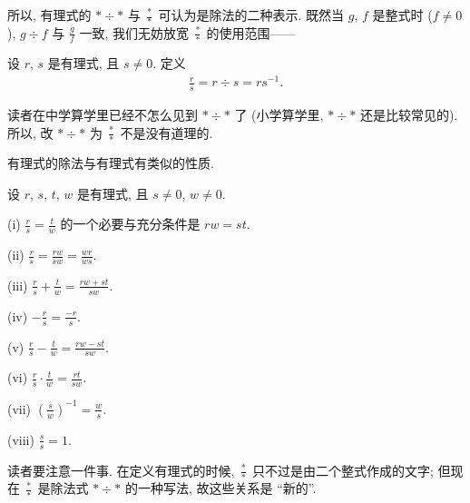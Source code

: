 所以, 有理式的 $\ast \div \ast$ 与 $\frac{\ast}{\ast}$ 可认为是除法的二种表示. 既然当 $g$, $f$ 是整式时 ($f \neq 0$), $g \div f$ 与 $\frac{g}{f}$ 一致, 我们无妨放宽 $\frac{\ast}{\ast}$ 的使用范围——
\begin{definition}
    设 $r$, $s$ 是有理式, 且 $s \neq 0$. 定义
    \begin{align*}
        \frac{r}{s} = r \div s = rs^{-1}.
    \end{align*}
\end{definition}

读者在中学算学里已经不怎么见到 $\ast \div \ast$ 了 (小学算学里, $\ast \div \ast$ 还是比较常见的). 所以, 改 $\ast \div \ast$ 为 $\frac{\ast}{\ast}$ 不是没有道理的.

有理式的除法与有理式有类似的性质.

\begin{proposition}
    设 $r$, $s$, $t$, $w$ 是有理式, 且 $s \neq 0$, $w \neq 0$.

    (i) $\frac{r}{s} = \frac{t}{w}$ 的一个必要与充分条件是 $rw = st$.

    (ii) $\frac{r}{s} = \frac{rw}{sw} = \frac{wr}{ws}$.

    (iii) $\frac{r}{s} + \frac{t}{w} = \frac{rw + st}{sw}$.

    (iv) $-\frac{r}{s} = \frac{-r}{s}$.

    (v) $\frac{r}{s} - \frac{t}{w} = \frac{rw - st}{sw}$.

    (vi) $\frac{r}{s} \cdot \frac{t}{w} = \frac{rt}{sw}$.

    (vii) $\left( \frac{s}{w} \right)^{-1} = \frac{w}{s}$.

    (viii) $\frac{s}{s} = 1$.
\end{proposition}

\begin{remark}
    读者要注意一件事. 在定义有理式的时候, $\frac{\ast}{\ast}$ 只不过是由二个整式作成的文字; 但现在 $\frac{\ast}{\ast}$ 是除法式 $\ast \div \ast$ 的一种写法, 故这些关系是 ``新的''.
\end{remark}


